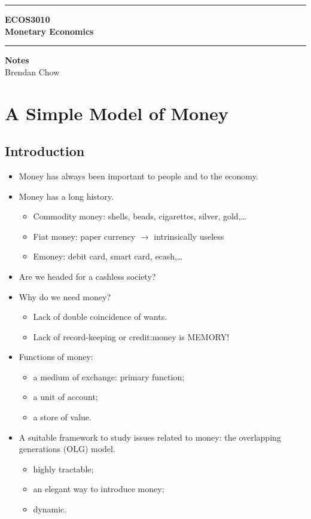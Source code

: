 \documentclass[a4paper,twoside]{article}
\newif\IfInSansMode
\numberwithin{equation}{section}
\numberwithin{figure}{section}
\begin{document}
\begin{titlepage}
	\centering
	\vspace*{4.5cm}
	\rule{\linewidth}{2pt}
	\LARGE\textbf{ECOS3010}\\
	\vspace{0.5cm}
	\Huge\textbf{Monetary Economics}\\
	\rule{\linewidth}{2pt}
	\LARGE\textbf{Notes}\\
	\vspace{1.5cm}
	\Large Brendan Chow
	\vfill
\end{titlepage}
	\newpage
	\pagebreak
	\tableofcontents
	\newpage
{}
\section{A Simple Model of Money}
\subsection{Introduction}
	\begin{itemize}
		\item Money has always been important to people and to the economy.
		\item Money has a long history.
		\begin{itemize}
			\item Commodity money: shells, beads, cigarettes, silver, gold,\ldots
		\item Fiat money: paper currency \( \rightarrow \) intrinsically useless
		\item Emoney: debit card, smart card, ecash,\ldots
		\end{itemize}
		\item  Are we headed for a cashless society?
		\item Why do we need money?
		\begin{itemize}
			\item Lack of double coincidence of wants.
			\item Lack of record-keeping or credit:\@ money is MEMORY!
		\end{itemize}
		\item Functions of money:
		\begin{itemize}
			\item a medium of exchange: primary function;
			\item a unit of account;
			\item a store of value.
		\end{itemize}
		\item A suitable framework to study issues related to money: the overlapping generations (OLG) model.
		\begin{itemize}
			\item highly tractable;
			\item an elegant way to introduce money;
			\item dynamic.
		\end{itemize}
	\end{itemize}
\end{document}
